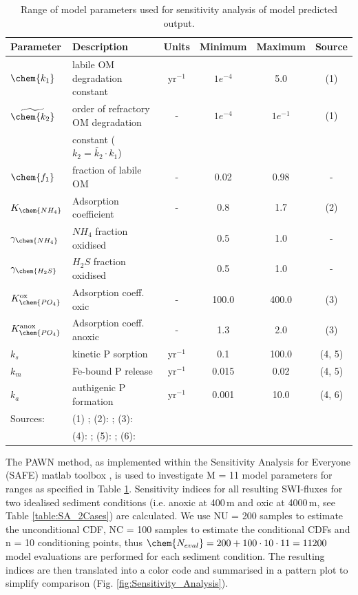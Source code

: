\documentclass[gmd, manuscript]{copernicus}
\begin{document}
\begin{table}[btp]
\caption{Range of model parameters used for sensitivity analysis of model predicted output.} 
\centering
\begin{tabular}{l l c c c c}
\hline\hline
Parameter & Description & Units & Minimum  & Maximum & Source\\
\hline
$\chem{k_1}$ & labile OM degradation constant & yr$^{-1}$ & $1e^{-4}$ & 5.0 & (1)\\
$\widetilde{\chem{k_2}}$ & order of refractory OM degradation & - & $1e^{-4}$ & $1e^{-1}$ &  (1)\\
 & constant ($k_2 = \widetilde{k_2} \cdot k_1$) & & &  &\\
$\chem{f_1}$ & fraction of labile OM & - & 0.02 & 0.98  & - \\
$K_{\chem{NH_4}}$ & Adsorption coefficient & - & 0.8 & 1.7  & (2) \\
$\gamma_\chem{NH_4}$ & $NH_4$ fraction oxidised &  & 0.5 & 1.0 & - \\
$\gamma_\chem{H_2S}$ &  $H_2S$ fraction oxidised  &  & 0.5 & 1.0 & - \\
$K_\chem{PO_4}^\mathrm{ox}$ & Adsorption coeff. oxic & - & 100.0 & 400.0  & (3) \\
$K_\chem{PO_4}^\mathrm{anox}$ & Adsorption coeff. anoxic & - & 1.3 & 2.0 & (3) \\
$k_{s}$ & kinetic P sorption & yr$^{-1}$  & 0.1 & 100.0 & (4, 5)\\
$k_{m}$ & Fe-bound P release & yr$^{-1}$  & 0.015 & 0.02 & (4, 5)\\
$k_{a}$ & authigenic P formation & yr$^{-1}$  & 0.001 & 10.0 & (4, 6)\\
\hline
Sources: &\multicolumn{5}{l}{(1) \citet{arndt_quantifying_2013}; (2): \citet{cappellen_cycling_1996}; (3): \citet{krom_adsorption_1980}}\\
&\multicolumn{5}{l}{(4): \citet{gypens_simple_2008}; (5): \citet{caroline_p_slomp_key_1996}; (6): \citet{cappellen_mathematical_1988}}
\end{tabular}
\label{table:SA_parameter_ranges}
\end{table}

The PAWN method, as implemented within the Sensitivity Analysis for Everyone (SAFE) matlab toolbox \citep{pianosi_matlab_2015}, is used to investigate M = 11 model parameters for ranges as specified in Table \ref{table:SA_parameter_ranges}. 
Sensitivity indices for all resulting SWI-fluxes for two idealised sediment conditions (i.e. anoxic at 400\,m and oxic at 4000\,m, see Table \ref{table:SA_2Cases}) are calculated. 
We use NU = 200 samples to estimate the unconditional CDF, NC = 100 samples to estimate the conditional CDFs and n = 10 conditioning points, thus 
$\chem{N_{eval}}=200+100\cdot10\cdot11 = 11200$ model evaluations are performed for each sediment condition. 
The resulting indices are then translated into a color code and summarised in a pattern plot to simplify comparison (Fig. \ref{fig:Sensitivity_Analysis}). 
\end{document}

